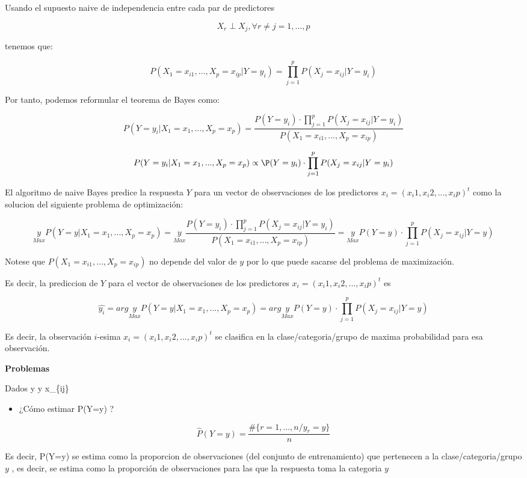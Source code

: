 \documentclass[
  11pt,
  a4paper,
]{article}
\providecommand{\tightlist}{%
  \setlength{\itemsep}{0pt}\setlength{\parskip}{0pt}}
\begin{document}
Usando el supuesto naive de independencia entre cada par de predictores

\[X_r \perp X_j , \forall r\neq j = 1,...,p\]

tenemos que:

\[P(X_1=x_{i1} ,..., X_p=x_{ip} | Y=y_i) = \prod_{j=1}^{p} P(X_j=x_{ij} | Y=y_i)\]

Por tanto, podemos reformular el teorema de Bayes como:

\[P(Y=y_i | X_1 = x_1 ,..., X_p=x_p) = \dfrac{P(Y=y_i)\cdot\prod_{j=1}^{p} P(X_j=x_{ij} | Y=y_i)}{P(X_1=x_{i1} ,..., X_p=x_{ip})}\]

\[P(Y=y_i | X_1 = x_1 ,..., X_p=x_p) \propto \P(Y=y_i)\cdot\prod_{j=1}^{p} P(X_j=x_{ij} | Y=y_i)\]

El algoritmo de naive Bayes predice la respuesta \(Y\) para un vector de
observaciones de los predictores \(x_i = (x_i1 , x_i2, ..., x_ip)^t\)
como la solucion del siguiente problema de optimización:

\[\underset{Max}{y} P(Y=y | X_1 = x_1 ,..., X_p=x_p) = \underset{Max}{y} \dfrac{P(Y=y_i)\cdot\prod_{j=1}^{p} P(X_j=x_{ij} | Y=y_i)}{P(X_1=x_{i1} ,..., X_p=x_{ip})} =   \underset{Max}{y}  P(Y=y) \cdot\prod_{j=1}^{p} P(X_j=x_{ij} | Y=y)\]

Notese que \(P(X_1=x_{i1} ,..., X_p=x_{ip})\) no depende del valor de
\(y\) por lo que puede sacarse del problema de maximización.

Es decir, la prediccion de \(Y\) para el vector de observaciones de los
predictores \(x_i = (x_i1 , x_i2, ..., x_ip)^t\) es

\[\hat{y_i} = arg \underset{Max}{y} P(Y=y | X_1 = x_1 ,..., X_p=x_p) = arg \underset{Max}{y} P(Y=y) \cdot\prod_{j=1}^{p} P(X_j=x_{ij} | Y=y)\]

Es decir, la observación \(i\)-esima
\(x_i = (x_i1 , x_i2, ..., x_ip)^t\) se clasifica en la
clase/categoria/grupo de maxima probabilidad para esa observación.

\textbf{Problemas}

Dados y y x\_\{ij\}

\begin{itemize}
\tightlist
\item
  ¿Cómo estimar P(Y=y) ?
\end{itemize}

\[\widehat{P}(Y=y) = \dfrac{\# \lbrace r=1,...,n / y_r = y  \rbrace}{n}\]

Es decir, P(Y=y) se estima como la proporcion de observaciones (del
conjunto de entrenamiento) que pertenecen a la clase/categoria/grupo
\(y\) , es decir, se estima como la proporción de observaciones para las
que la respuesta toma la categoria \(y\)
\end{document}
